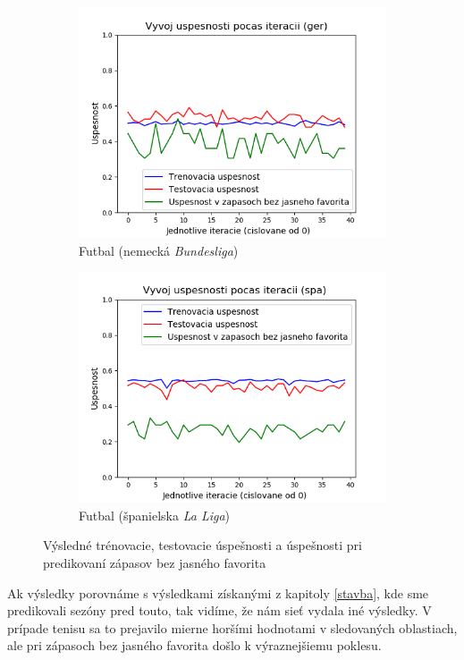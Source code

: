 \begin{figure}[h!]
\begin{subfigure}[b]{0.48\linewidth}
    \includegraphics[width=\linewidth]{../img/ffnn_ger_res.png} 
    \caption{Futbal (nemecká \textit{Bundesliga})} 
  \end{subfigure}
  \hfill
  \begin{subfigure}[b]{0.48\linewidth}
    \includegraphics[width=\linewidth]{../img/ffnn_spa_res2.png} 
    \caption{Futbal (španielska \textit{La Liga})} 
  \end{subfigure}
  \caption{Výsledné trénovacie, testovacie úspešnosti a úspešnosti pri predikovaní zápasov bez jasného favorita} 
   \label{fig7} 
\end{figure}

Ak výsledky porovnáme s výsledkami získanými z kapitoly \ref{stavba}, kde sme pre\-di\-ko\-va\-li sezóny pred touto, tak vidíme, že nám sieť vydala iné výsledky.
V prípade tenisu sa to prejavilo mierne horšími hodnotami v sledovaných oblastiach, ale pri zápasoch bez jasného favorita došlo k výraznejšiemu poklesu.


